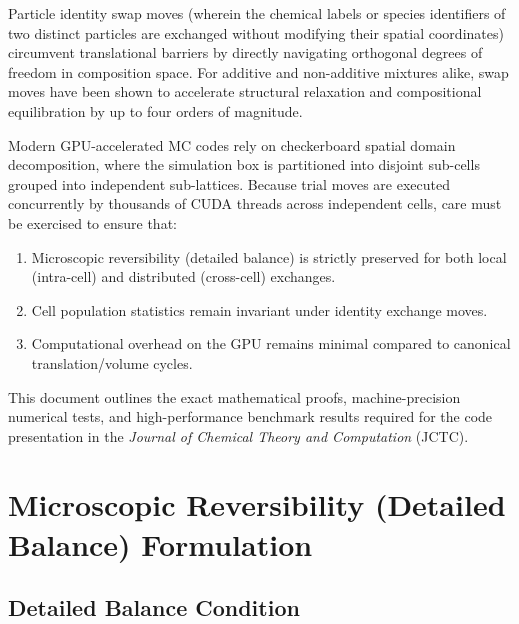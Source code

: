 \documentclass[11pt,a4paper]{article}
\begin{document}
Particle identity swap moves (wherein the chemical labels or species identifiers of two distinct particles are exchanged without modifying their spatial coordinates) circumvent translational barriers by directly navigating orthogonal degrees of freedom in composition space. For additive and non-additive mixtures alike, swap moves have been shown to accelerate structural relaxation and compositional equilibration by up to four orders of magnitude.

Modern GPU-accelerated MC codes rely on checkerboard spatial domain decomposition, where the simulation box is partitioned into disjoint sub-cells grouped into independent sub-lattices. Because trial moves are executed concurrently by thousands of CUDA threads across independent cells, care must be exercised to ensure that:
\begin{enumerate}
    \item Microscopic reversibility (detailed balance) is strictly preserved for both local (intra-cell) and distributed (cross-cell) exchanges.
    \item Cell population statistics remain invariant under identity exchange moves.
    \item Computational overhead on the GPU remains minimal compared to canonical translation/volume cycles.
\end{enumerate}

This document outlines the exact mathematical proofs, machine-precision numerical tests, and high-performance benchmark results required for the code presentation in the \textit{Journal of Chemical Theory and Computation} (JCTC).

\section{Microscopic Reversibility (Detailed Balance) Formulation}

\subsection{Detailed Balance Condition}
\end{document}
